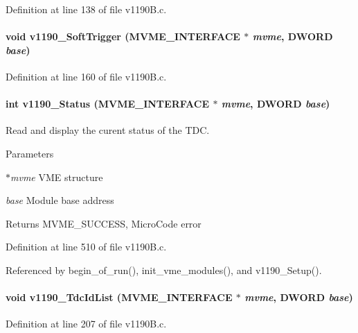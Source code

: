 Definition at line 138 of file v1190B.c.
\paragraph[{v1190\_\-SoftTrigger}]{\setlength{\rightskip}{0pt plus 5cm}void v1190\_\-SoftTrigger ({\bf MVME\_\-INTERFACE} $\ast$ {\em mvme}, \/  {\bf DWORD} {\em base})}\hfill\label{v1190B_8h_a00cdc1d39a5ff4e2dde5df17429a9fdf}


Definition at line 160 of file v1190B.c.
\paragraph[{v1190\_\-Status}]{\setlength{\rightskip}{0pt plus 5cm}int v1190\_\-Status ({\bf MVME\_\-INTERFACE} $\ast$ {\em mvme}, \/  {\bf DWORD} {\em base})}\hfill\label{v1190B_8h_a620a197083a0d776491f7bd620e2effd}
Read and display the curent status of the TDC. 
\begin{DoxyParams}{Parameters}
\item[{\em $\ast$mvme}]VME structure \item[{\em base}]Module base address \end{DoxyParams}
\begin{DoxyReturn}{Returns}
MVME\_\-SUCCESS, MicroCode error 
\end{DoxyReturn}


Definition at line 510 of file v1190B.c.

Referenced by begin\_\-of\_\-run(), init\_\-vme\_\-modules(), and v1190\_\-Setup().
\paragraph[{v1190\_\-TdcIdList}]{\setlength{\rightskip}{0pt plus 5cm}void v1190\_\-TdcIdList ({\bf MVME\_\-INTERFACE} $\ast$ {\em mvme}, \/  {\bf DWORD} {\em base})}\hfill\label{v1190B_8h_a5c6daf7dc9fa2cbce32423a6224ba4b9}


Definition at line 207 of file v1190B.c.
